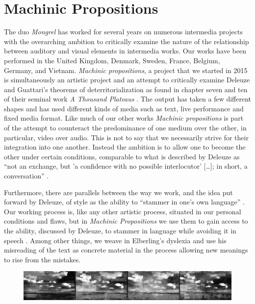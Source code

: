 \documentclass[11pt]{article}
\begin{document}
\section*{Machinic Propositions}
\label{sec:mongrel}

The duo \emph{Mongrel} has worked for several years on
numerous intermedia projects with the overarching ambition to critically
examine the nature of the relationship between auditory and visual
elements in intermedia works. Our works have been performed in the
United Kingdom, Denmark, Sweden, France, Belgium, Germany, and
Vietnam. \emph{Machinic propositions}, a project that we started in
2015 is simultaneously an artistic project and an attempt to critically examine Deleuze and
Guattari's theorems of deterritorialization as found in chapter seven
and ten of their seminal work \emph{A Thousand Plateaus}
\citep{deleuze80}. The output has taken a few different shapes and
has used different kinds of media such as text, live
performance and fixed media
format. Like much of our other works \emph{Machinic propositions} is
part of the attempt to counteract the predominance of one medium over
the other, in particular, video over audio. This is not to say that we necessarily
strive for their integration into one another. Instead the ambition
is to allow one to become the other under certain conditions,
comparable to what is described by Deleuze as ``not an exchange, but
'a confidence with no possible interlocutor' [\ldots]; in short, a
conversation'' \citep[p. 2]{deleuze77}.

Furthermore, there are parallels between the way we work,
and the idea put forward by Deleuze, of style as the ability to
``stammer in one's own language'' \citep[p. 3]{deleuze77}. Our working
process is, like any other artistic process, situated in our personal conditions and
flaws, but in \emph{Machinic Propositions} we use them to
gain access to the ability, discussed by Deleuze, to stammer in
language while avoiding it in speech \citet[p. 3]{deleuze77}. Among other things, we weave in Elberling's dyslexia and use his misreading of
the text as concrete material in the process allowing new meanings to rise from the mistakes.

\begin{figure}\label{fig:impro-1}
  \centering
  \includegraphics[width=\linewidth]{img/final/Mongrel_landskab_4pr_row_ELISK_monoC}
\end{figure}
\end{document}
